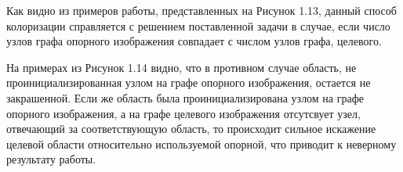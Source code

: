 \begin{figure}[ht!]
\end{figure}

Как видно из примеров работы, представленных на Рисунок 1.13, данный способ колоризации справляется с решением поставленной задачи в случае, если число узлов графа опорного изображения совпадает с числом узлов графа, целевого.


 На примерах из Рисунок 1.14 видно, что в противном случае область, не проинициализированная узлом на графе опорного изображения, остается не закрашенной. Если же область была проинициализирована узлом на графе опорного изображения, а на графе целевого изображения отсутсвует узел, отвечающий за соответствующую область, то происходит сильное искажение целевой области относительно используемой опорной, что приводит к неверному результату работы.